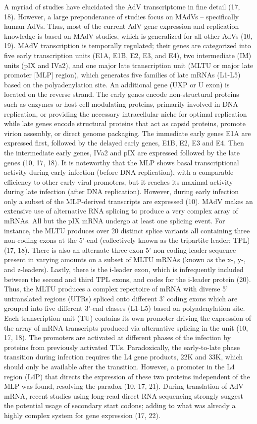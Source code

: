 \documentclass[
]{article}
\begin{document}
A myriad of studies have elucidated the AdV transcriptome in fine detail
(17, 18). However, a large preponderance of studies focus on MAdVs --
specifically human AdVs. Thus, most of the current AdV gene expression
and replication knowledge is based on MAdV studies, which is generalized
for all other AdVs (10, 19). MAdV transcription is temporally regulated;
their genes are categorized into five early transcription units (E1A,
E1B, E2, E3, and E4), two intermediate (IM) units (pIX and IVa2), and
one major late transcription unit (MLTU or major late promoter {[}MLP{]}
region), which generates five families of late mRNAs (L1-L5) based on
the polyadenylation site. An additional gene (UXP or U exon) is located
on the reverse strand. The early genes encode non-structural proteins
such as enzymes or host-cell modulating proteins, primarily involved in
DNA replication, or providing the necessary intracellular niche for
optimal replication while late genes encode structural proteins that act
as capsid proteins, promote virion assembly, or direct genome packaging.
The immediate early genes E1A are expressed first, followed by the
delayed early genes, E1B, E2, E3 and E4. Then the intermediate early
genes, IVa2 and pIX are expressed followed by the late genes (10, 17,
18). It is noteworthy that the MLP shows basal transcriptional activity
during early infection (before DNA replication), with a comparable
efficiency to other early viral promoters, but it reaches its maximal
activity during late infection (after DNA replication). However, during
early infection only a subset of the MLP-derived transcripts are
expressed (10). MAdV makes an extensive use of alternative RNA splicing
to produce a very complex array of mRNAs. All but the pIX mRNA undergo
at least one splicing event. For instance, the MLTU produces over 20
distinct splice variants all containing three non-coding exons at the
5'-end (collectively known as the tripartite leader; TPL) (17, 18).
There is also an alternate three-exon 5' non-coding leader sequence
present in varying amounts on a subset of MLTU mRNAs (known as the x-,
y-, and z-leaders). Lastly, there is the i-leader exon, which is
infrequently included between the second and third TPL exons, and codes
for the i-leader protein (20). Thus, the MLTU produces a complex
repertoire of mRNA with diverse 5' untranslated regions (UTRs) spliced
onto different 3' coding exons which are grouped into five different
3'-end classes (L1-L5) based on polyadenylation site. Each transcription
unit (TU) contains its own promoter driving the expression of the array
of mRNA transcripts produced via alternative splicing in the unit (10,
17, 18). The promoters are activated at different phases of the
infection by proteins from previously activated TUs. Paradoxically, the
early-to-late phase transition during infection requires the L4 gene
products, 22K and 33K, which should only be available after the
transition. However, a promoter in the L4 region (L4P) that directs the
expression of these two proteins independent of the MLP was found,
resolving the paradox (10, 17, 21). During translation of AdV mRNA,
recent studies using long-read direct RNA sequencing strongly suggest
the potential usage of secondary start codons; adding to what was
already a highly complex system for gene expression (17, 22).
\end{document}

